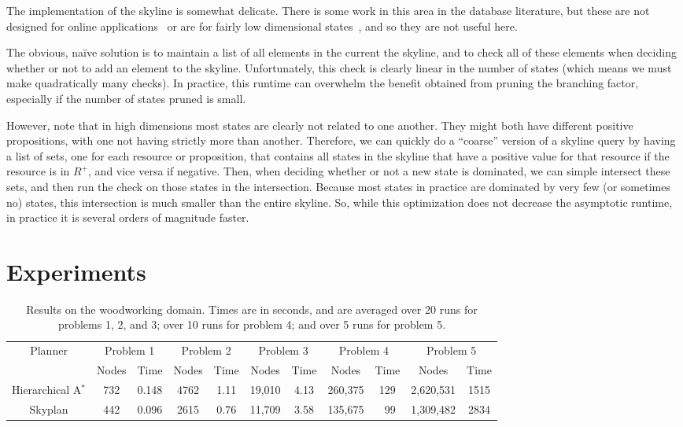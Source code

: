 \documentclass[letterpaper]{article}
\theoremstyle{plain} \newtheorem{theorem}{Theorem} \newtheorem{proposition}{Proposition} \newtheorem{lemma}{Lemma}
\theoremstyle{definition} \newtheorem{definition}{Definition} \newtheorem{conjecture}{Conjecture} \newtheorem*{example}{Example}
\theoremstyle{remark} \newtheorem*{remark}{Remark} \newtheorem*{note}{Note} \newtheorem{case}{Case}
\newcommand{\Astar}{A$^*$ }
\begin{document}
The implementation of the skyline is somewhat delicate.  There
is some work in this area in the database literature, but these are
not designed for online applications~\citep{skylineoperator,tan01efficient}
or are for fairly low dimensional states~\citep{KossmannRR02}, and
so they are not useful here.

The obvious, na\"ive solution is to maintain a list of all elements
in the current the skyline, and to check all of these elements when
deciding whether or not to add an element to the skyline. Unfortunately,
this check is clearly linear in the number of states (which means
we must make quadratically many checks). In practice, this
runtime can overwhelm the benefit obtained from pruning the branching factor,
especially if the number of states pruned is small.

However, note that in high dimensions most states are clearly not
related to one another.  They might both have different positive
propositions, with one not having strictly more than another.
Therefore, we can quickly do a ``coarse'' version of a skyline query
by having a list of sets, one for each resource or proposition,
that contains all states in the skyline that have a positive value
for that resource if the resource is in $R^+$, and
vice versa if negative. Then, when deciding whether or not a new
state is dominated, we can simple intersect these sets, and then
run the check on those states in the intersection. Because most
states in practice are dominated by very few (or sometimes no)
states, this intersection is much smaller than the entire skyline.
So, while this optimization does not decrease the asymptotic runtime,
in practice it is several orders of magnitude faster.



\section{Experiments}


\begin{table}
	\begin{center}
		\begin{tabular}{|c|cc|cc|cc|cc|cc|}
		\hline
		\multirow{2}{*}{Planner} & \multicolumn{2}{c|}{Problem 1}  & \multicolumn{2}{c|}{Problem 2} & \multicolumn{2}{c|}{Problem 3} & \multicolumn{2}{c|}{Problem 4} & \multicolumn{2}{c|}{Problem 5} \\
		& Nodes & Time & Nodes & Time & Nodes & Time & Nodes & Time & Nodes & Time \\
		\hline
		Hierarchical \Astar & 732 & 0.148 & 4762 & 1.11 & 19,010 & 4.13 & 260,375 & 129 & 2,620,531 & 1515 \\
		Skyplan         & 442 & 0.096 & 2615 & 0.76 & 11,709 & 3.58 & 135,675 & ~99 & 1,309,482 & 2834 \\
		\hline
		\end{tabular}
	\end{center}
	\caption{Results on the woodworking domain. Times are in seconds, and are averaged over 20 runs for problems 1, 2, and 3; over 10 runs for problem 4; and over 5 runs for problem 5.}
	\label{tab:woodworking}
\end{table}
\end{document}
